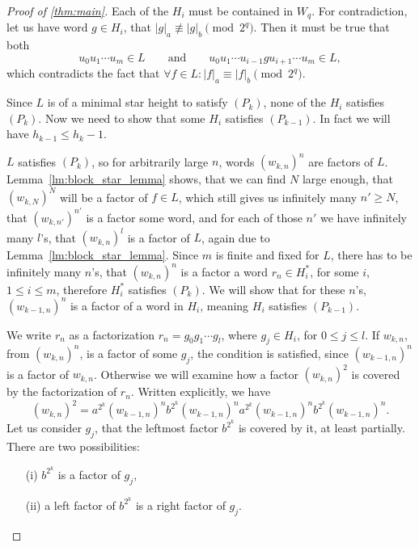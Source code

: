 \begin{proof}[Proof of \autoref*{thm:main}]
    Each of the $H_i$ must be contained in $W_q$. For contradiction, let us have word $g \in H_i$, that $|g|_a \not\equiv |g|_b \pmod{2^q}$. Then it must be true that both
    \[
        u_0 u_1 \dotsm u_m \in L \qquad \text{and} \qquad u_0 u_1 \dotsm u_{i-1} g u_{i+1} \dotsm u_m \in L,
    \]
    which contradicts the fact that $\forall f \in L: |f|_a \equiv |f|_b \pmod{2^q}$.

    Since $L$ is of a minimal star height to satisfy $(P_k)$, none of the $H_i$ satisfies $(P_k)$. Now we need to show that some $H_i$ satisfies $(P_{k-1})$. In fact we will have $h_{k-1} \leq h_k - 1$.

    $L$ satisfies $(P_k)$, so for arbitrarily large $n$, words ${(w_{k,n})}^n$ are factors of $L$.  Lemma~\ref*{lm:block_star_lemma} shows, that we can find $N$ large enough, that ${(w_{k,N})}^N$ will be a factor of $f \in L$, which still gives us infinitely many $n' \geq N$, that ${(w_{k,n'})}^{n'}$ is a factor some word, and for each of those $n'$ we have infinitely many $l$'s, that ${(w_{k,n})}^l$ is a factor of $L$, again due to Lemma~\ref*{lm:block_star_lemma}. Since $m$ is finite and fixed for $L$, there has to be infinitely many $n$'s, that ${(w_{k,n})}^n$ is a factor a word $r_n \in H_i^*$, for some $i$, $1 \leq i \leq m$, therefore $H_i^*$ satisfies $(P_k)$. We will show that for these $n$'s, ${(w_{k-1,n})}^n$ is a factor of a word in $H_i$, meaning $H_i$ satisfies $(P_{k-1})$.

    We write $r_n$ as a factorization $r_n = g_0 g_1 \dotsm g_l$, where $g_j \in H_i$, for $0 \leq j \leq l$. If $w_{k,n}$, from ${(w_{k,n})}^n$, is a factor of some $g_j$, the condition is satisfied, since ${(w_{k-1,n})}^n$ is a factor of $w_{k,n}$. Otherwise we will examine how a factor ${(w_{k,n})}^2$ is covered by the factorization of $r_n$. Written explicitly, we have
    \[
        {(w_{k,n})}^2 = a^{2^k}{(w_{k-1,n})}^{n}b^{2^k}{(w_{k-1,n})}^{n}a^{2^k}{(w_{k-1,n})}^{n}b^{2^k}{(w_{k-1,n})}^{n}.
    \]
    Let us consider $g_j$, that the leftmost factor $b^{2^k}$ is covered by it, at least partially. There are two possibilities:
    \begin{enumerate}
        \item[(i)] $b^{2^k}$ is a factor of $g_j$,
        \item[(ii)] a left factor of $b^{2^k}$ is a right factor of $g_j$.
    \end{enumerate}


\end{proof}
